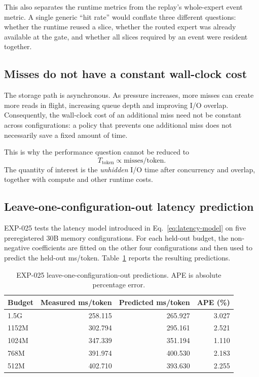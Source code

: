 This also separates the runtime metrics from the replay's whole-expert event metric. A single generic ``hit rate'' would conflate three different questions: whether the runtime reused a slice, whether the routed expert was already available at the gate, and whether all slices required by an event were resident together.

\subsection{Misses do not have a constant wall-clock cost}

The storage path is asynchronous. As pressure increases, more misses can create more reads in flight, increasing queue depth and improving I/O overlap. Consequently, the wall-clock cost of an additional miss need not be constant across configurations: a policy that prevents one additional miss does not necessarily save a fixed amount of time.

This is why the performance question cannot be reduced to
\[
    T_{\mathrm{token}}
    \propto
    \text{misses/token}.
\]
The quantity of interest is the \emph{unhidden} I/O time after concurrency and overlap, together with compute and other runtime costs.

\subsection{Leave-one-configuration-out latency prediction}

EXP-025 tests the latency model introduced in Eq.~\eqref{eq:latency-model} on five preregistered 30B memory configurations. For each held-out budget, the non-negative coefficients are fitted on the other four configurations and then used to predict the held-out ms/token. Table~\ref{tab:loo-predictions} reports the resulting predictions.

\begin{table}[t]
    \centering
    \caption{EXP-025 leave-one-configuration-out predictions. APE is absolute percentage error.}
    \label{tab:loo-predictions}
    \small
    \begin{tabular}{lrrr}
        \toprule
        Budget & Measured ms/token & Predicted ms/token & APE (\%) \\
        \midrule
        1.5G  & 258.115 & 265.927 & 3.027 \\
        1152M & 302.794 & 295.161 & 2.521 \\
        1024M & 347.339 & 351.194 & 1.110 \\
        768M  & 391.974 & 400.530 & 2.183 \\
        512M  & 402.710 & 393.630 & 2.255 \\
        \bottomrule
    \end{tabular}
\end{table}

